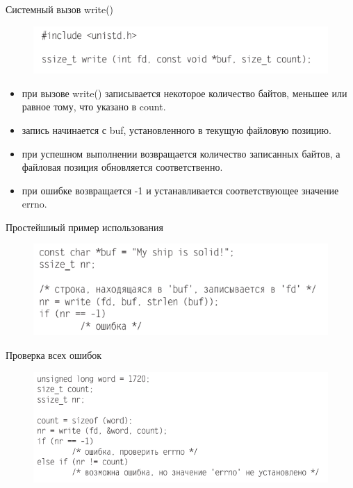 \documentclass{beamer}
\begin{document}
\begin{frame}{Системный вызов write()}
\begin{figure}[h]
\centering
\includegraphics[scale=0.6]{images/lec06-pic11.png}
\end{figure}
\begin{itemize}
\item при вызове write() записывается некоторое количество байтов, меньшее или
равное тому, что указано в count. 
\item запись начинается с buf, установленного в текущую файловую позицию. 
\item при успешном выполнении возвращается количество записанных байтов, а файловая позиция обновляется соответственно. 
\item при ошибке возвращается -1 и устанавливается соответствующее значение errno.
\end{itemize}
\end{frame}

\begin{frame}{Простейшиый пример использования}
\begin{figure}[h]
\centering
\includegraphics[scale=0.6]{images/lec06-pic12.png}
\end{figure}
\end{frame}

\begin{frame}{Проверка всех ошибок}
\begin{figure}[h]
\centering
\includegraphics[scale=0.6]{images/lec06-pic13.png}
\end{figure}
\end{frame}
\end{document}
